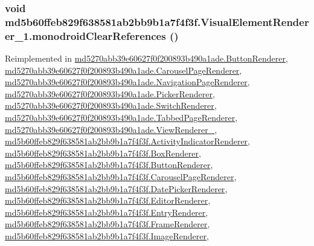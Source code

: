 {\subsubsection[{monodroidClearReferences}]{\setlength{\rightskip}{0pt plus 5cm}void md5b60ffeb829f638581ab2bb9b1a7f4f3f.VisualElementRenderer\_\-1.monodroidClearReferences ()}}
\label{classmd5b60ffeb829f638581ab2bb9b1a7f4f3f_1_1_visual_element_renderer__1_4a1c180026d8eab71549e47b7de4b9b8}




Reimplemented in \hyperlink{classmd5270abb39e60627f0f200893b490a1ade_1_1_button_renderer_85b560fcbb7fbef8f3ec48b9bf724210}{md5270abb39e60627f0f200893b490a1ade.ButtonRenderer}, \hyperlink{classmd5270abb39e60627f0f200893b490a1ade_1_1_carousel_page_renderer_7f418b0c33eb2a6154244df3ce1ab3d0}{md5270abb39e60627f0f200893b490a1ade.CarouselPageRenderer}, \hyperlink{classmd5270abb39e60627f0f200893b490a1ade_1_1_navigation_page_renderer_61d42127ac3ca068adc349d6a33af47a}{md5270abb39e60627f0f200893b490a1ade.NavigationPageRenderer}, \hyperlink{classmd5270abb39e60627f0f200893b490a1ade_1_1_picker_renderer_8ea4822897e59386ee80a0fccf40c367}{md5270abb39e60627f0f200893b490a1ade.PickerRenderer}, \hyperlink{classmd5270abb39e60627f0f200893b490a1ade_1_1_switch_renderer_269d9c853effc1c0864414f6ee8130f3}{md5270abb39e60627f0f200893b490a1ade.SwitchRenderer}, \hyperlink{classmd5270abb39e60627f0f200893b490a1ade_1_1_tabbed_page_renderer_3b2f80dac52df3f43f79ec6bd4748239}{md5270abb39e60627f0f200893b490a1ade.TabbedPageRenderer}, \hyperlink{classmd5270abb39e60627f0f200893b490a1ade_1_1_view_renderer__2_4832372c2c5755cd4e9f279f9b051454}{md5270abb39e60627f0f200893b490a1ade.ViewRenderer\_}, \hyperlink{classmd5b60ffeb829f638581ab2bb9b1a7f4f3f_1_1_activity_indicator_renderer_53c663b171496cdee3e0eca02ade7e9d}{md5b60ffeb829f638581ab2bb9b1a7f4f3f.ActivityIndicatorRenderer}, \hyperlink{classmd5b60ffeb829f638581ab2bb9b1a7f4f3f_1_1_box_renderer_2f64a02b513057089e1099ba75855aa2}{md5b60ffeb829f638581ab2bb9b1a7f4f3f.BoxRenderer}, \hyperlink{classmd5b60ffeb829f638581ab2bb9b1a7f4f3f_1_1_button_renderer_95654f418661c12f44eaabf4ec84d2d0}{md5b60ffeb829f638581ab2bb9b1a7f4f3f.ButtonRenderer}, \hyperlink{classmd5b60ffeb829f638581ab2bb9b1a7f4f3f_1_1_carousel_page_renderer_e1977d178a6be8e92ddec489238ad42a}{md5b60ffeb829f638581ab2bb9b1a7f4f3f.CarouselPageRenderer}, \hyperlink{classmd5b60ffeb829f638581ab2bb9b1a7f4f3f_1_1_date_picker_renderer_272024ba18637be81cb9cd68055ccc07}{md5b60ffeb829f638581ab2bb9b1a7f4f3f.DatePickerRenderer}, \hyperlink{classmd5b60ffeb829f638581ab2bb9b1a7f4f3f_1_1_editor_renderer_b75e496c1b4ff6e3f542989834b44b8d}{md5b60ffeb829f638581ab2bb9b1a7f4f3f.EditorRenderer}, \hyperlink{classmd5b60ffeb829f638581ab2bb9b1a7f4f3f_1_1_entry_renderer_5ad12d956145127cb1bb040a5c2d369b}{md5b60ffeb829f638581ab2bb9b1a7f4f3f.EntryRenderer}, \hyperlink{classmd5b60ffeb829f638581ab2bb9b1a7f4f3f_1_1_frame_renderer_9122665ff96453c943de70afacc24f32}{md5b60ffeb829f638581ab2bb9b1a7f4f3f.FrameRenderer}, \hyperlink{classmd5b60ffeb829f638581ab2bb9b1a7f4f3f_1_1_image_renderer_4787f75a8b34aa5636dbd2a7df23c9bf}{md5b60ffeb829f638581ab2bb9b1a7f4f3f.ImageRenderer}, 